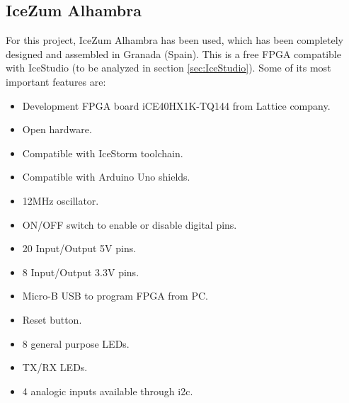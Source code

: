 \subsection{IceZum Alhambra}
For this project, IceZum Alhambra\cite{Alhambra} has been used, which has been completely designed and assembled in Granada (Spain).\newline
This is a free FPGA compatible with IceStudio (to be analyzed in section \ref{sec:IceStudio}). Some of its most important features are:
\begin{itemize}
	\item Development FPGA board iCE40HX1K-TQ144 from Lattice company. 
	\item Open hardware.
	\item Compatible with IceStorm toolchain.
	\item Compatible with Arduino Uno shields. 
	\item 12MHz oscillator.
	\item ON/OFF switch to enable or disable digital pins.
	\item 20 Input/Output 5V pins.
	\item 8 Input/Output 3.3V pins.
	\item Micro-B USB to program FPGA from PC.
	\item Reset button.
	\item 8 general purpose LEDs.
	\item TX/RX LEDs.
	\item 4 analogic inputs available through i2c.
\end{itemize}


